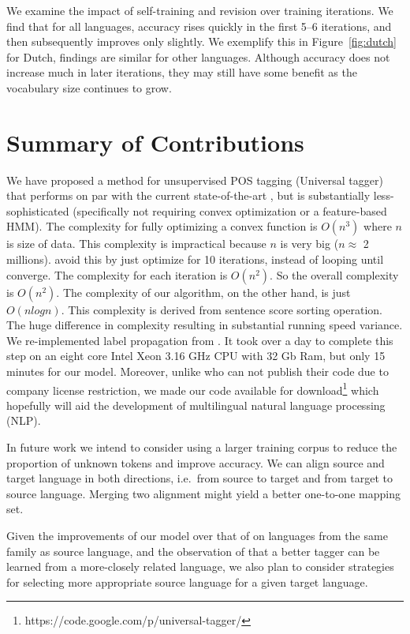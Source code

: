 We examine the impact of self-training and revision over training
iterations. We find that for all languages, accuracy rises quickly in
the first 5--6 iterations, and then subsequently improves only
slightly. We exemplify this in Figure~\ref{fig:dutch} for Dutch, findings are similar for other languages. Although accuracy does not increase much in later iterations, they may still have some benefit as the vocabulary size continues to grow.

\section{Summary of Contributions}

We have proposed a method for unsupervised POS tagging (Universal tagger) that performs on par with the current state-of-the-art \cite{Das:2011}, but is substantially less-sophisticated (specifically not requiring convex 
optimization or a feature-based HMM). The complexity for fully optimizing a convex function is $O(n^3)$ where $n$ is size of data. This complexity is impractical because $n$ is very big ($n \approx $ 2 millions).  avoid this by just optimize for 10 iterations, instead of looping until converge. The complexity for each iteration is $O(n^2)$. So the overall complexity is $O(n^2)$. The complexity of our algorithm, on the other hand, is just $O(nlogn)$. This complexity is derived from sentence score sorting operation. The huge difference in complexity resulting in substantial running speed variance. We re-implemented label propagation from \cite{Das:2011}. It took over a day to complete this step on an eight core Intel Xeon 3.16 GHz CPU with 32 Gb Ram, but only 15 minutes for our model.  Moreover, unlike  who can not publish their code due to company license restriction, we made our code available for download\footnote{https://code.google.com/p/universal-tagger/} which hopefully will aid the development of multilingual natural language processing (NLP).

In future work we intend to consider using a larger training corpus to reduce the proportion of unknown tokens and improve accuracy. We can align source and target language in both directions, i.e.\ from source to target and from target to source language. Merging two alignment might yield a better one-to-one mapping set.

Given the improvements of our model over that of \citeauthor{Das:2011} on languages from the same family as source language, and the observation of
 that a better tagger can be learned from
a more-closely related language, we also plan to consider strategies
for selecting more appropriate source language for a given target
language. 

